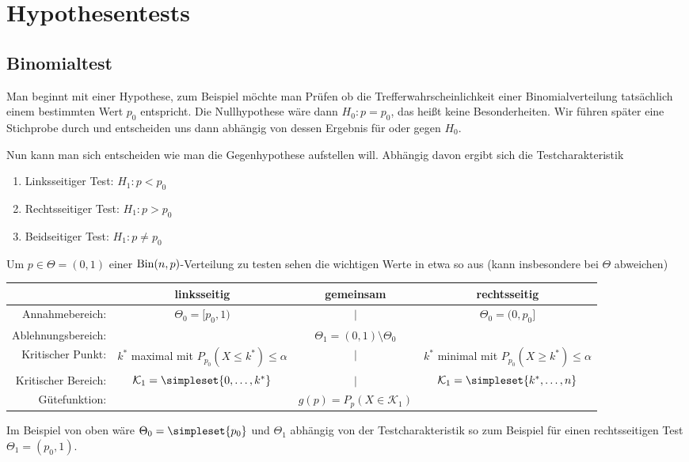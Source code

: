 \chapter{Hypothesentests}
\section{Binomialtest}
Man beginnt mit einer Hypothese, zum Beispiel möchte man Prüfen ob die Trefferwahrscheinlichkeit einer Binomialverteilung tatsächlich einem bestimmten Wert $p_0$ entspricht.
Die Nullhypothese wäre dann $H_0: p=p_0$, das heißt keine Besonderheiten. Wir führen später eine Stichprobe durch und entscheiden uns dann abhängig von dessen Ergebnis für oder gegen $H_0$.

Nun kann man sich entscheiden wie man die Gegenhypothese aufstellen will. Abhängig davon ergibt sich die Testcharakteristik
\begin{enumerate}
	\item Linksseitiger Test: $H_1: p<p_0$
	\item Rechtsseitiger Test: $H_1: p>p_0$
	\item Beidseitiger Test: $H_1: p\neq p_0$
\end{enumerate}
Um $p\in\Theta=(0,1)$ einer $\operatorname{Bin}(n,p)$-Verteilung zu testen sehen die wichtigen Werte in etwa so aus (kann insbesondere bei $\Theta$ abweichen)
\begin{center}
	\begin{tabular}{r|ccc}
		&linksseitig&gemeinsam&rechtsseitig\\\hline
		Annahmebereich:&$\Theta_0=[p_0,1)$&$\Big|$&$\Theta_0=(0,p_0]$\\
		Ablehnungsbereich:&&$\Theta_1=(0,1)\setminus\Theta_0$&\\
		Kritischer Punkt:&\makecell{$k^\ast$ maximal mit\\ $P_{p_0}(X\leq k^\ast)\leq\alpha$}&$\Bigg|$&\makecell{$k^\ast$ minimal mit\\ $P_{p_0}(X\geq k^\ast)\leq\alpha$}\\
		Kritischer Bereich:&$\mathcal K_1=\simpleset{0,\ldots,k^\ast}$&$\Big|$&$\mathcal K_1=\simpleset{k^\ast,\ldots,n}$\\
		Gütefunktion:&&$g(p)=P_p(X\in\mathcal K_1)$&\\
	\end{tabular}
\end{center}
Im Beispiel von oben wäre $\Theta_0=\simpleset{p_0}$ und $\Theta_1$ abhängig von der Testcharakteristik so zum Beispiel für einen rechtsseitigen Test $\Theta_1=(p_0,1)$.


